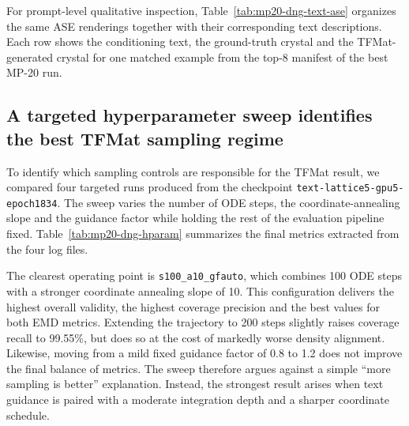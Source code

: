 \documentclass[fleqn,10pt]{wlscirep}
\begin{document}
For prompt-level qualitative inspection, Table~\ref{tab:mp20-dng-text-ase} organizes the same ASE renderings together with their corresponding text descriptions. Each row shows the conditioning text, the ground-truth crystal and the TFMat-generated crystal for one matched example from the top-8 manifest of the best MP-20 run.


\subsection*{A targeted hyperparameter sweep identifies the best TFMat sampling regime}
To identify which sampling controls are responsible for the TFMat result, we compared four targeted runs produced from the checkpoint \texttt{text-lattice5-gpu5-epoch1834}. The sweep varies the number of ODE steps, the coordinate-annealing slope and the guidance factor while holding the rest of the evaluation pipeline fixed. Table~\ref{tab:mp20-dng-hparam} summarizes the final metrics extracted from the four log files.

The clearest operating point is \texttt{s100\_a10\_gfauto}, which combines 100 ODE steps with a stronger coordinate annealing slope of 10. This configuration delivers the highest overall validity, the highest coverage precision and the best values for both EMD metrics. Extending the trajectory to 200 steps slightly raises coverage recall to 99.55\%, but does so at the cost of markedly worse density alignment. Likewise, moving from a mild fixed guidance factor of 0.8 to 1.2 does not improve the final balance of metrics. The sweep therefore argues against a simple ``more sampling is better'' explanation. Instead, the strongest result arises when text guidance is paired with a moderate integration depth and a sharper coordinate schedule.
\end{document}
